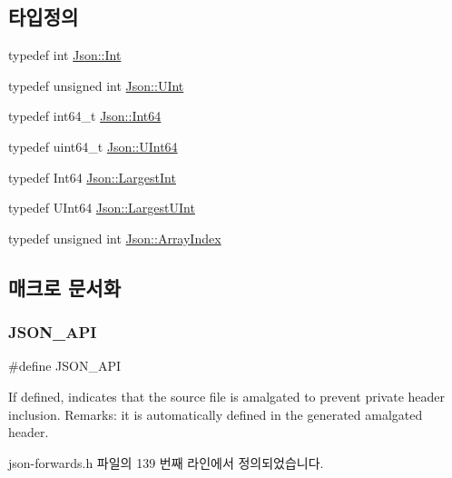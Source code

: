 \subsection*{타입정의}
\begin{DoxyCompactItemize}
\item 
typedef int \hyperlink{namespace_json_a08122e8005b706d982e48cca1e2119c7}{Json\+::\+Int}
\item 
typedef unsigned int \hyperlink{namespace_json_a800fb90eb6ee8d5d62b600c06f87f7d4}{Json\+::\+U\+Int}
\item 
typedef int64\+\_\+t \hyperlink{namespace_json_ac62566f36fd33115957b91305c9ed1dc}{Json\+::\+Int64}
\item 
typedef uint64\+\_\+t \hyperlink{namespace_json_adf3fa5cb60c619e4f02315ad355e0ca1}{Json\+::\+U\+Int64}
\item 
typedef Int64 \hyperlink{namespace_json_a218d880af853ce786cd985e82571d297}{Json\+::\+Largest\+Int}
\item 
typedef U\+Int64 \hyperlink{namespace_json_ae202ecad69725e23443f465e257456d0}{Json\+::\+Largest\+U\+Int}
\item 
typedef unsigned int \hyperlink{namespace_json_a8048e741f2177c3b5d9ede4a5b8c53c2}{Json\+::\+Array\+Index}
\end{DoxyCompactItemize}


\subsection{매크로 문서화}
\mbox{\label{json-forwards_8h_a1d61ffde86ce1a18fd83194ff0d9a206}} 
\subsubsection{\texorpdfstring{J\+S\+O\+N\+\_\+\+A\+PI}{JSON\_API}}
{\footnotesize\ttfamily \#define J\+S\+O\+N\+\_\+\+A\+PI}

If defined, indicates that the source file is amalgated to prevent private header inclusion. Remarks\+: it is automatically defined in the generated amalgated header. 

json-\/forwards.\+h 파일의 139 번째 라인에서 정의되었습니다.

\mbox{\label{json-forwards_8h_a71f1a94bee4773f2a6e30eeac7deb963}} 
